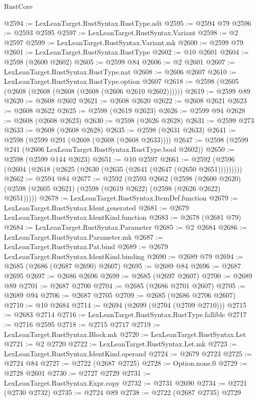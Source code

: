 \begin{lexlean}{RustCore}
\begin{coremodule}
@2594 := LexLeanTarget.RustSyntax.RustType.adt
@2595 := @2594 @79
@2596 := @2593 @2595
@2597 := LexLeanTarget.RustSyntax.Variant
@2598 := @2 @2597
@2599 := LexLeanTarget.RustSyntax.Variant.mk
@2600 := @2599 @79
@2601 := LexLeanTarget.RustSyntax.RustType
@2602 := @10 @2601
@2604 := @2598 (@2600 @2602)
@2605 := @2599 @84
@2606 := @2 @2601
@2607 := LexLeanTarget.RustSyntax.RustType.nat
@2608 := @2606 @2607
@2610 := LexLeanTarget.RustSyntax.RustType.option @2607
@2618 := @2598 (@2605 (@2608 (@2608 (@2608 (@2608 (@2606 @2610 @2602))))))
@2619 := @2599 @89
@2620 := @2608 @2602
@2621 := @2608 @2620
@2622 := @2608 @2621
@2623 := @2608 @2622
@2625 := @2598 (@2619 @2623)
@2626 := @2599 @94
@2628 := @2608 (@2608 @2623)
@2630 := @2598 (@2626 @2628)
@2631 := @2599 @273
@2633 := @2608 (@2608 @2628)
@2635 := @2598 (@2631 @2633)
@2641 := @2598 (@2599 @291 (@2608 (@2608 (@2608 @2633))))
@2647 := @2598 (@2599 @241 (@2606 LexLeanTarget.RustSyntax.RustType.bool @2602))
@2650 := @2598 (@2599 @144 @2623)
@2651 := @10 @2597
@2661 := @2592 (@2596 (@2604 (@2618 (@2625 (@2630 (@2635 (@2641 (@2647 (@2650 @2651)))))))))
@2662 := @2594 @84
@2677 := @2592
    (@2593
      @2662
      (@2598 (@2600 @2620) (@2598 (@2605 @2621) (@2598 (@2619 @2622) (@2598 (@2626 @2622) @2651)))))
@2678 := LexLeanTarget.RustSyntax.ItemDef.function
@2679 := LexLeanTarget.RustSyntax.Ident.generated
@2681 := @2679 LexLeanTarget.RustSyntax.IdentKind.function
@2683 := @2678 (@2681 @79)
@2684 := LexLeanTarget.RustSyntax.Parameter
@2685 := @2 @2684
@2686 := LexLeanTarget.RustSyntax.Parameter.mk
@2687 := LexLeanTarget.RustSyntax.Pat.bind
@2689 := @2679 LexLeanTarget.RustSyntax.IdentKind.binding
@2690 := @2689 @79
@2694 := @2685 (@2686 (@2687 @2690) @2607)
@2695 := @2689 @84
@2696 := @2687 @2695
@2697 := @2686 @2696
@2699 := @2685 (@2697 @2607)
@2700 := @2689 @89
@2701 := @2687 @2700
@2704 := @2685 (@2686 @2701 @2607)
@2705 := @2689 @94
@2706 := @2687 @2705
@2709 := @2685 (@2686 @2706 @2607)
@2710 := @10 @2684
@2714 := @2694 (@2699 (@2704 (@2709 @2710)))
@2715 := @2683 @2714
@2716 := LexLeanTarget.RustSyntax.RustType.fallible
@2717 := @2716 @2595
@2718 := @2715 @2717
@2719 := LexLeanTarget.RustSyntax.Block.mk
@2720 := LexLeanTarget.RustSyntax.Let
@2721 := @2 @2720
@2722 := LexLeanTarget.RustSyntax.Let.mk
@2723 := LexLeanTarget.RustSyntax.IdentKind.operand
@2724 := @2679 @2723
@2725 := @2724 @84
@2727 := @2722 (@2687 @2725)
@2728 := Option.none.{0}
@2729 := @2728 @2601
@2730 := @2727 @2729
@2731 := LexLeanTarget.RustSyntax.Expr.copy
@2732 := @2731 @2690
@2734 := @2721 (@2730 @2732)
@2735 := @2724 @89
@2738 := @2722 (@2687 @2735) @2729

\end{coremodule}
\end{lexlean}
